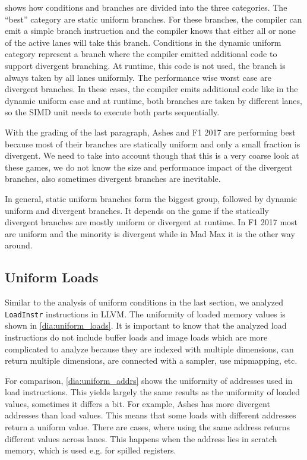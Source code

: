 

 shows how conditions and branches are divided into the three categories.
The \enquote{best} category are static uniform branches.
For these branches, the compiler can emit a simple branch instruction and the compiler knows that either all or none of the active lanes will take this branch.
Conditions in the dynamic uniform category represent a branch where the compiler emitted additional code to support divergent branching.
At runtime, this code is not used, the branch is always taken by all lanes uniformly.
The performance wise worst case are divergent branches.
In these cases, the compiler emits additional code like in the dynamic uniform case and at runtime, both branches are taken by different lanes, so the SIMD unit needs to execute both parts sequentially.

With the grading of the last paragraph, Ashes and F1 2017 are performing best because most of their branches are statically uniform and only a small fraction is divergent.
We need to take into account though that this is a very coarse look at these games, we do not know the size and performance impact of the divergent branches, also sometimes divergent branches are inevitable.

In general, static uniform branches form the biggest group, followed by dynamic uniform and divergent branches.
It depends on the game if the statically divergent branches are mostly uniform or divergent at runtime.
In F1 2017 most are uniform and the minority is divergent while in Mad Max it is the other way around.

\subsection{Uniform Loads}
\label{sub:eval_uniform_loads}
Similar to the analysis of uniform conditions in the last section, we analyzed \texttt{LoadInstr} instructions in LLVM.
The uniformity of loaded memory values is shown in \cref{dia:uniform_loads}.
It is important to know that the analyzed load instructions do not include buffer loads and image loads which are more complicated to analyze because they are indexed with multiple dimensions, can return multiple dimensions, are connected with a sampler, use mipmapping, etc.


For comparison, \cref{dia:uniform_addrs} shows the uniformity of addresses used in load instructions.
This yields largely the same results as the uniformity of loaded values, sometimes it differs a bit.
For example, Ashes has more divergent addresses than load values.
This means that some loads with different addresses return a uniform value.
There are cases, where using the same address returns different values across lanes.
This happens when the address lies in scratch memory, which is used e.g. for spilled registers.


